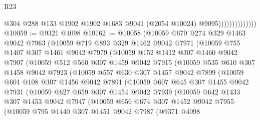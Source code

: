 \begin{lexlean}{R23}
\begin{coremodule}
                                @304
                                @288
                                @133
                                @1902
                                @1902
                                @1683
                                @9041
                                (@2054 @10024)
                                @9095))))))))))))))
@10059 := @9321 @4098
@10162 := @10058
    (@10059
      @670
      @274
      @329
      @1463
      @9042
      @7963
      (@10059
        @719
        @893
        @329
        @1462
        @9042
        @7971
        (@10059
          @755
          @1407
          @307
          @1461
          @9042
          @7979
          (@10059
            @152
            @1412
            @307
            @1460
            @9042
            @7907
            (@10059
              @512
              @560
              @307
              @1459
              @9042
              @7915
              (@10059
                @535
                @610
                @307
                @1458
                @9042
                @7923
                (@10059
                  @557
                  @630
                  @307
                  @1457
                  @9042
                  @7899
                  (@10059
                    @601
                    @108
                    @307
                    @1456
                    @9042
                    @7891
                    (@10059
                      @607
                      @645
                      @307
                      @1455
                      @9042
                      @7931
                      (@10059
                        @627
                        @659
                        @307
                        @1454
                        @9042
                        @7939
                        (@10059
                          @642
                          @1433
                          @307
                          @1453
                          @9042
                          @7947
                          (@10059
                            @656
                            @674
                            @307
                            @1452
                            @9042
                            @7955
                            (@10059
                              @795
                              @1440
                              @307
                              @1451
                              @9042
                              @7987
                              (@9371
                                @4098

\end{coremodule}
\end{lexlean}
